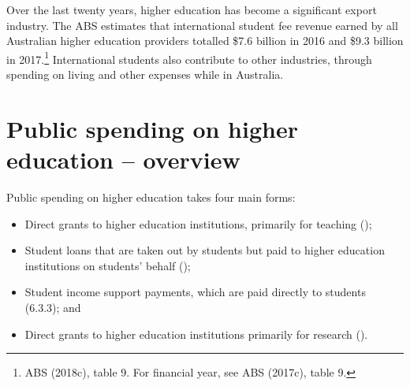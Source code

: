 \documentclass{grattan}
\begin{document}
Over the last twenty years, higher education has become a significant export industry. The ABS estimates that international student fee revenue earned by all Australian higher education providers totalled \$7.6 billion in 2016 and \$9.3 billion in 2017.\footnote{ABS (2018c), table 9. For financial year, see ABS (2017c), table 9.} International students also contribute to other industries, through spending on living and other expenses while in Australia.

%
\section{Public spending on higher education -- overview}\label{sec:public-spending-on-higher-education-overview}

Public spending on higher education takes four main forms:

\begin{itemize}
\item
  Direct grants to higher education institutions, primarily for teaching ();
\item
  Student loans that are taken out by students but paid to higher education institutions on students' behalf ();
\item
  Student income support payments, which are paid directly to students (6.3.3); and
\item
  Direct grants to higher education institutions primarily for research ().
\end{itemize}
\end{document}
